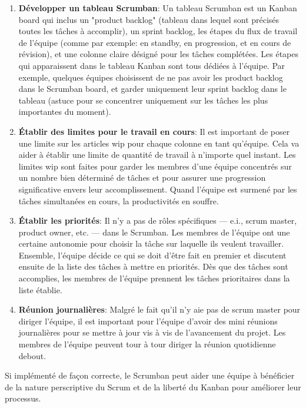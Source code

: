 \documentclass[../main.tex]{subfiles}
\begin{document}
    \begin{enumerate}
    \item \textbf{Développer un tableau Scrumban}: Un tableau Scrumban est un Kanban board qui inclus un "product backlog" (tableau dans lequel sont précisés toutes les tâches à accomplir), un sprint backlog, les étapes du flux de travail de l'équipe (comme par exemple: en standby, en progression, et en cours de révision), et une colonne claire désigné pour les tâches complétées.    
    Les étapes qui apparaissent dans le tableau Kanban sont tous dédiées à l'équipe. Par exemple, quelques équipes choisissent de ne pas avoir les product backlog dans le Scrumban board, et garder uniquement leur sprint backlog dans le tableau (astuce pour se concentrer uniquement sur les tâches les plus importantes du moment).
    \item \textbf{Établir des limites pour le travail en cours}: Il est important de poser une limite sur les articles \acrfull{wip} pour chaque colonne en tant qu'équipe. Cela va aider à établir une limite de quantité de travail à n'importe quel instant. 
    Les limites \acrshort{wip} sont faites pour garder les membres d'une équipe concentrés sur un nombre bien déterminé de tâches et pour assurer une progression significative envers leur accomplissement. Quand l'équipe est surmené par les tâches simultanées en cours, la productivités en souffre. 
    \item \textbf{Établir les priorités}: Il n'y a pas de rôles spécifiques — e.i., scrum master, product owner, etc. — dans le Scrumban. Les membres de l'équipe ont une certaine autonomie pour choisir la tâche sur laquelle ils veulent travailler.
    Ensemble, l'équipe décide ce qui se doit d'être fait en premier et discutent ensuite de la liste des tâches à mettre en priorités.
    Dès que des tâches sont accomplies, les membres de l'équipe prennent les tâches prioritaires dans la liste établie.
    \item \textbf{Réunion journalières}: Malgré le fait qu'il n'y aie pas de scrum master pour diriger l'équipe, il est important pour l'équipe d'avoir des mini réunions journalières pour se mettre à jour vis à vis de l'avancement du projet.
    Les membres de l'équipe peuvent tour à tour diriger la réunion quotidienne debout.  
    \end{enumerate}
    Si implémenté de façon correcte, le Scrumban peut aider une équipe à bénéficier de la nature perscriptive du Scrum et de la liberté du Kanban pour améliorer leur processus.
    
\end{document}
